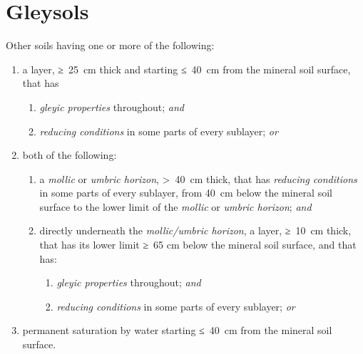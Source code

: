 \documentclass[
  letterpaper,
  DIV=11,
  numbers=noendperiod]{scrreprt}
\providecommand{\tightlist}{%
  \setlength{\itemsep}{0pt}\setlength{\parskip}{0pt}}\usepackage{longtable,booktabs,array}
\begin{document}

\hypertarget{key-gleysols}{%
\chapter{Gleysols}\label{key-gleysols}}

Other soils having one or more of the following:

\begin{enumerate}
\def\labelenumi{\arabic{enumi}.}
\tightlist
\item
  a layer, ≥~25~cm thick and starting ≤~40~cm from the mineral soil
  surface, that has

  \begin{enumerate}
  \def\labelenumii{\alph{enumii}.}
  \tightlist
  \item
    \emph{gleyic properties} throughout; \emph{and}
  \item
    \emph{reducing conditions} in some parts of every sublayer;
    \emph{or}
  \end{enumerate}
\item
  both of the following:

  \begin{enumerate}
  \def\labelenumii{\alph{enumii}.}
  \tightlist
  \item
    a \emph{mollic} or \emph{umbric horizon}, \textgreater~40~cm thick,
    that has \emph{reducing conditions} in some parts of every sublayer,
    from 40~cm below the mineral soil surface to the lower limit of the
    \emph{mollic} or \emph{umbric horizon}; \emph{and}
  \item
    directly underneath the \emph{mollic/umbric horizon}, a layer,
    ≥~10~cm thick, that has its lower limit ≥~65 cm below the mineral
    soil surface, and that has:

    \begin{enumerate}
    \def\labelenumiii{\roman{enumiii}.}
    \tightlist
    \item
      \emph{gleyic properties} throughout; \emph{and}
    \item
      \emph{reducing conditions} in some parts of every sublayer;
      \emph{or}
    \end{enumerate}
  \end{enumerate}
\item
  permanent saturation by water starting ≤~40~cm from the mineral soil
  surface.
\end{enumerate}
\end{document}
